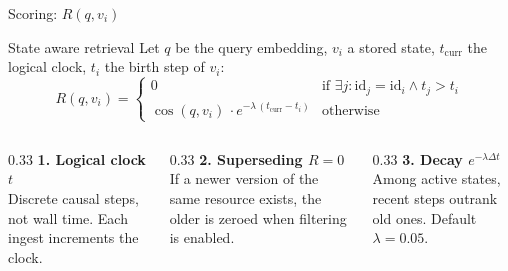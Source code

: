 \documentclass[aspectratio=169,10pt]{beamer}
\begin{document}
\begin{frame}{Scoring: $R(q,v_i)$}
  \begin{block}{State aware retrieval}
    Let $q$ be the query embedding, $v_i$ a stored state, $t_{\mathrm{curr}}$ the logical clock, $t_i$ the birth step of $v_i$:
    \[
      R(q,v_i)=
      \begin{cases}
        0 & \text{if }\exists j: \text{id}_j=\text{id}_i \land t_j>t_i\\[2pt]
        \cos(q,v_i)\,\cdot e^{-\lambda\,(t_{\mathrm{curr}}-t_i)} & \text{otherwise}
      \end{cases}
    \]
  \end{block}
  \vspace{0.3em}
  \begin{columns}[T,onlytextwidth]
    \begin{column}{0.33\textwidth}
      \textbf{1. Logical clock $t$}\\[1pt]
      {\footnotesize Discrete causal steps, not wall time. Each ingest increments the clock.}
    \end{column}
    \begin{column}{0.33\textwidth}
      \textbf{2. Superseding $R=0$}\\[1pt]
      {\footnotesize If a newer version of the same resource exists, the older is zeroed when filtering is enabled.}
    \end{column}
    \begin{column}{0.33\textwidth}
      \textbf{3. Decay $e^{-\lambda\Delta t}$}\\[1pt]
      {\footnotesize Among active states, recent steps outrank old ones. Default $\lambda=0.05$.}
    \end{column}
  \end{columns}
\end{frame}
\end{document}
